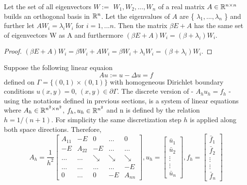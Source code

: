 \documentclass[11pt,a4paper,twoside]{article}
\begin{document}
\begin{lemma} \label{eigenLema} Let the set of all eigenvectors $W :=$ $W_1, W_2, ..., W_n$ of a real matrix $A \in \mathbb{R}^{n \times n}$ builds an orthogonal basis in $\mathbb{R}^n$. Let the eigenvalues of $A$ are \{ $\lambda_1, ..., \lambda_n$ \} and further let $AW_i = \lambda_i W_i$ for $i=1,...n$. Then the matrix $\beta E + A$ has the same set of eigenvectors W as A and furthermore $( \beta E + A) W_i = (\beta + \lambda_i)W_i$.
\end{lemma}

\begin{proof}
$(\beta E + A)W_i = \beta W_i + AW_i = \beta W_i + \lambda_i W_i = (\beta + \lambda_i)W_i$.
\end{proof}
Suppose the following linear equaion
\begin{equation}\label{FPeq}
Au:=u-\Delta u = f
\end{equation}
defined on $\Gamma = \{ (0,1) \times (0,1) \}$ with homogeneous Dirichlet boundary conditions $u(x,y) = 0$, $(x,y) \in \partial \Gamma$. The discrete version of  - $A_h u_h = f_h$ - using the notations defined in previous sections, is a system of linear equations where $A_h \in \mathbb{R}^{n^2 \times n^2}$, $f_h, u_h \in \mathbb{R}^{n^2}$ and n is defined by the relation $h=1/(n+1)$. For simplicity the same discretization step $h$ is applied along both space directions. Therefore,
\[
A_h = \frac{1}{h^2}
\begin{bmatrix}
    A_{11}       & -E          &  0              & \dots & 0 \\
    -E               & A_{22}  & -E              & \dots & \dots  \\
      \dots         & \dots     & \searrow  & \searrow  & \searrow  \\
      \dots         & \dots    & \dots         & \dots & -E  \\
     0                 & \dots   &  0               & -E    & A_{nn}
\end{bmatrix}
,
u_h = 
\begin{bmatrix}
    \bar u_{1} \\
    \bar u_{2}  \\
    \vdots  \\
    \vdots  \\
    \bar u_{n}
\end{bmatrix}
,
f_h = 
\begin{bmatrix}
    \bar f_{1} \\
    \bar f_{2}  \\
    \vdots  \\
    \vdots  \\
    \bar f_{n}
\end{bmatrix}
\]
\end{document}

